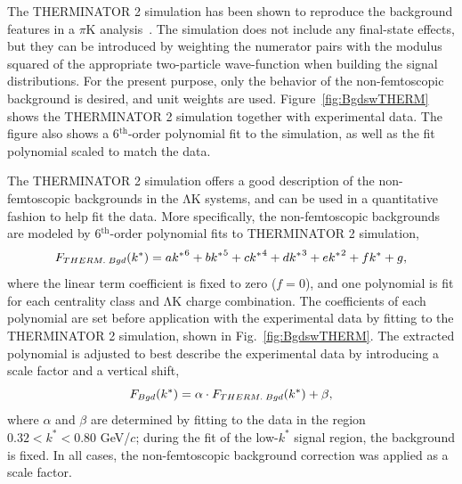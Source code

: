 \documentclass{svproc}
\newcommand{\kstar}{$k^{*}$\xspace}
\newcommand{\LamK}{$\mathrm{\Lambda}\mathrm{K}$\xspace}
\begin{document}
The THERMINATOR 2 simulation has been shown to reproduce the background features in a $\pi$K analysis~\cite{Kisiel:2017}. 
The simulation does not include any final-state effects, but they can be introduced by weighting the numerator pairs with the modulus squared of the appropriate two-particle wave-function when building the signal distributions. 
For the present purpose, only the behavior of the non-femtoscopic background is desired, and unit weights are used.
Figure~\ref{fig:BgdswTHERM} shows the THERMINATOR 2 simulation together with experimental data.  
The figure also shows a 6$^{\mathrm{th}}$-order polynomial fit to the simulation, as well as the fit polynomial scaled to match the data.

The THERMINATOR 2 simulation offers a good description of the non-femtoscopic backgrounds in the \LamK systems, and can be used in a quantitative fashion to help fit the data.
More specifically, the non-femtoscopic backgrounds are modeled by 6$^{\mathrm{th}}$-order polynomial fits to THERMINATOR 2 simulation,
\begin{equation}
F_{\scaleto{THERM.\; Bgd}{6pt}}(k^{*}) = a{k^{*}}^{6}+ b{k^{*}}^{5} + c{k^{*}}^{4} + d{k^{*}}^{3} + e{k^{*}}^{2} + fk^{*} + g,
\end{equation}
where the linear term coefficient is fixed to zero ($f=0$), and one polynomial is fit for each centrality class and \LamK charge combination.
The coefficients of each polynomial are set before application with the experimental data by fitting to the THERMINATOR 2 simulation, shown in Fig.~\ref{fig:BgdswTHERM}.
The extracted polynomial is adjusted to best describe the experimental data by introducing a scale factor and a vertical shift,
\begin{equation}
F_{\scaleto{Bgd}{6pt}}(k^{*}) = \alpha\cdot F_{\scaleto{THERM.\; Bgd}{6pt}}(k^{*}) + \beta,
\end{equation}
where $\alpha$ and $\beta$ are determined by fitting to the data in the region $0.32 < k^{*} < 0.80$ GeV/$c$; during the fit of the low-\kstar signal region, the background is fixed.
In all cases, the non-femtoscopic background correction was applied as a scale factor.
\end{document}
